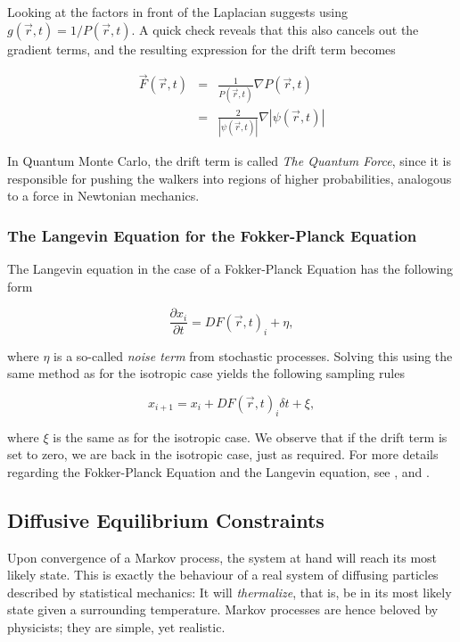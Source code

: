 Looking at the factors in front of the Laplacian suggests using $g(\vec r, t) = 1/P(\vec r, t)$. A quick check reveals that this also cancels out the gradient terms, and the resulting expression for the drift term becomes

\begin{eqnarray}
 \vec F(\vec r, t) &=& \frac{1}{P(\vec r, t)}\nabla P(\vec r, t) \nonumber \\
                   &=& \frac{2}{|\psi(\vec r, t)|}\nabla |\psi(\vec r, t)|
\end{eqnarray}

In Quantum Monte Carlo, the drift term is called \textit{The Quantum Force}, since it is responsible for pushing the walkers into regions of higher probabilities, analogous to a force in Newtonian mechanics.

\subsubsection{The Langevin Equation for the Fokker-Planck Equation}

The Langevin equation in the case of a Fokker-Planck Equation has the following form

\begin{equation}
 \frac{\partial x_i}{\partial t} = D F(\vec r, t)_i + \eta,
\end{equation}

where $\eta$ is a so-called \textit{noise term} from stochastic processes. Solving this using the same method as for the isotropic case yields the following sampling rules

\begin{equation}
 \label{eq:langevinSolFP}
 x_{i+1} = x_i + DF(\vec r, t)_i\delta t + \xi,
\end{equation}

where $\xi$ is the same as for the isotropic case. We observe that if the drift term is set to zero, we are back in the isotropic case, just as required. For more details regarding the Fokker-Planck Equation and the Langevin equation, see \cite{Gardiner:2004bk}, \cite{risken1989fpe} and \cite{langevin}.


\subsection{Diffusive Equilibrium Constraints}

Upon convergence of a Markov process, the system at hand will reach its most likely state. This is exactly the behaviour of a real system of diffusing particles described by statistical mechanics: It will \textit{thermalize}, that is, be in its most likely state given a surrounding temperature. Markov processes are hence beloved by physicists; they are simple, yet realistic. 

